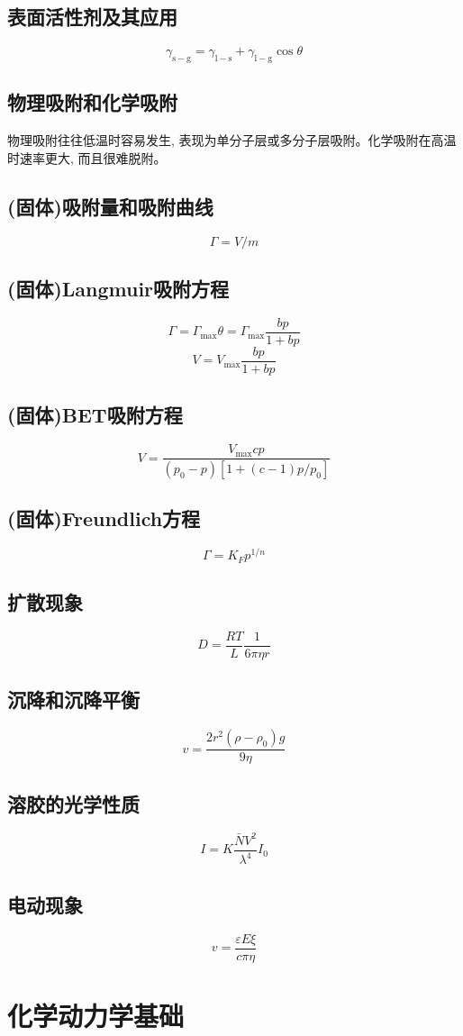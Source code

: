 \documentclass[twocolumn]{article}
\newcommand{\equ}[1]{\begin{equation*}#1\end{equation*}}
\newcommand{\xkh}[1]{\left(#1\right)}
\newcommand{\pf}{^{2}}
\begin{document}
\subsection{表面活性剂及其应用}
\equ{\gamma_{\mathrm{s-g}}=\gamma_{\mathrm{l-s}}+\gamma_{\mathrm{l-g}}\cos\theta}
\subsection{物理吸附和化学吸附}
物理吸附往往低温时容易发生, 表现为单分子层或多分子层吸附。化学吸附在高温时速率更大, 而且很难脱附。
\subsection{(固体)吸附量和吸附曲线}
\equ{\Gamma=V/m}
\subsection{(固体)Langmuir吸附方程}
\equ{\Gamma=\Gamma_{\mathrm{max}}\theta=\Gamma_{\mathrm{max}}\frac{bp}{1+bp}}
\equ{V=V_{\mathrm{max}}\frac{bp}{1+bp}}
\subsection{(固体)BET吸附方程}
\equ{V=\frac{V_{\mathrm{max}}cp}{\xkh{p_{0}-p}\left[1+\xkh{c-1}p/p_{0}\right]}}
\subsection{(固体)Freundlich方程}
\equ{\Gamma=K_{F}p^{1/n}}
\subsection{扩散现象}
\equ{D=\frac{RT}{L}\frac{1}{6\pi \eta r }}
\subsection{沉降和沉降平衡}
\equ{v=\frac{2r\pf{\xkh{\rho-\rho_{0}}g}}{9\eta}}
\subsection{溶胶的光学性质}
\equ{I=K\frac{\bar{N}V\pf}{\lambda^{4}}I_{0}}
\subsection{电动现象}
\equ{v=\frac{\varepsilon E\xi}{c\pi\eta}}
\section{化学动力学基础}
\end{document}
